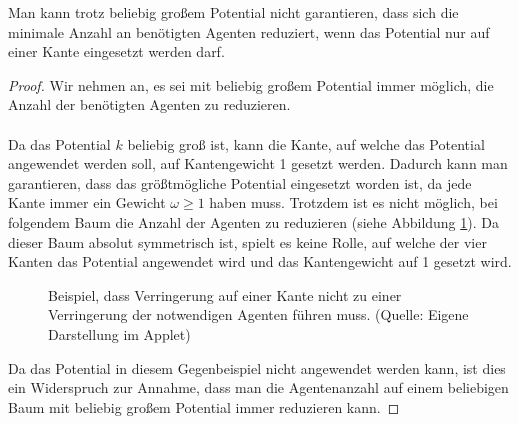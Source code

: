 \begin{theorem}
	Man kann trotz beliebig großem Potential nicht garantieren, dass sich die minimale Anzahl an benötigten Agenten reduziert, wenn das Potential nur auf einer Kante eingesetzt werden darf.
\end{theorem}

\begin{proof}
	Wir nehmen an, es sei mit beliebig großem Potential immer möglich, die Anzahl der benötigten Agenten zu reduzieren.
	\\
	\\	
	Da das Potential $k$ beliebig groß ist, kann die Kante, auf welche das Potential angewendet werden soll, auf Kantengewicht 1 gesetzt werden. Dadurch kann man garantieren, dass das größtmögliche Potential eingesetzt worden ist, da jede Kante immer ein Gewicht $\omega \geq 1$ haben muss. Trotzdem ist es nicht möglich, bei folgendem Baum die Anzahl der Agenten zu reduzieren (siehe Abbildung \ref{abb_gegenbeispielMaxPotential}). Da dieser Baum absolut symmetrisch ist, spielt es keine Rolle, auf welche der vier Kanten das Potential angewendet wird und das Kantengewicht auf 1 gesetzt wird.
	
	\begin{figure}[hbt]
		
		\captionsetup{width=0.9\textwidth}
		\caption{Beispiel, dass Verringerung auf einer Kante nicht zu einer Verringerung der notwendigen Agenten führen muss. (Quelle: Eigene Darstellung im Applet)} 
		\label{abb_gegenbeispielMaxPotential}
	\end{figure} 
	
	Da das Potential in diesem Gegenbeispiel nicht angewendet werden kann, ist dies ein Widerspruch zur Annahme, dass man die Agentenanzahl auf einem beliebigen Baum mit beliebig großem Potential immer reduzieren kann.
\end{proof}

